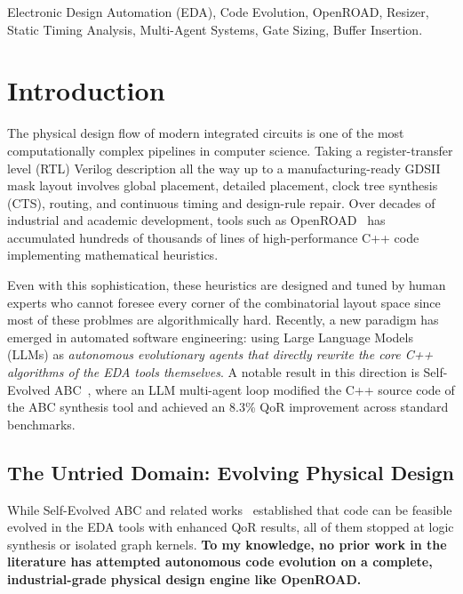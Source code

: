 \documentclass[10pt, conference]{IEEEtran}
\begin{document}
\begin{IEEEkeywords}
Electronic Design Automation (EDA), Code Evolution, OpenROAD, Resizer, Static Timing Analysis, Multi-Agent Systems, Gate Sizing, Buffer Insertion.
\end{IEEEkeywords}

\section{Introduction}
\label{sec:intro}

The physical design flow of modern integrated circuits is one of the most computationally complex pipelines in computer science. Taking a register-transfer level (RTL) Verilog description all the way up to a manufacturing-ready GDSII mask layout involves global placement, detailed placement, clock tree synthesis (CTS), routing, and continuous timing and design-rule repair. Over decades of industrial and academic development, tools such as OpenROAD~\cite{openroad} has accumulated hundreds of thousands of lines of high-performance C++ code implementing mathematical heuristics.

Even with this sophistication, these heuristics are designed and tuned by human experts who cannot foresee every corner of the combinatorial layout space since most of these problmes are algorithmically hard. Recently, a new paradigm has emerged in automated software engineering: using Large Language Models (LLMs) as \emph{autonomous evolutionary agents that directly rewrite the core C++ algorithms of the EDA tools themselves}. A notable result in this direction is Self-Evolved ABC~\cite{selfevolvedabc}, where an LLM multi-agent loop modified the C++ source code of the ABC synthesis tool and achieved an 8.3\% QoR improvement across standard benchmarks.

\subsection{The Untried Domain: Evolving Physical Design}

While Self-Evolved ABC and related works~\cite{alphaevolve,satlution,vprevolve} established that code can be feasible evolved in the EDA tools with enhanced QoR results, all of them stopped at logic synthesis or isolated graph kernels. \textbf{To my knowledge, no prior work in the literature has attempted autonomous code evolution on a complete, industrial-grade physical design engine like OpenROAD.}
\end{document}
